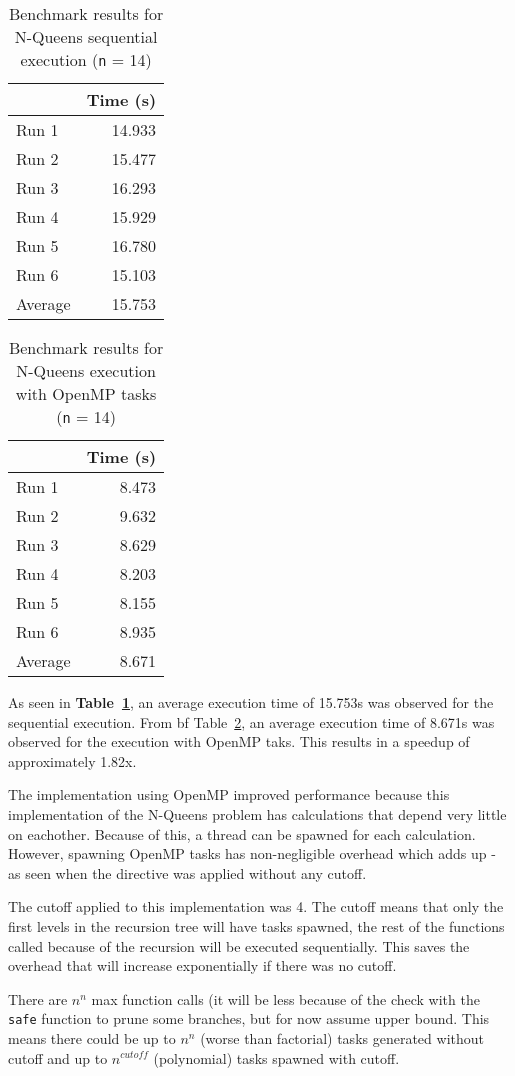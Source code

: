 \documentclass[12pt]{article}
\begin{document}
\begin{table}[H]
  \centering
  \begin{tabular}{lr}
    & {\bf Time (s)} \\
    \hline
    Run 1 & 14.933 \\
    Run 2 & 15.477 \\
    Run 3 & 16.293 \\
    Run 4 & 15.929 \\
    Run 5 & 16.780 \\
    Run 6 & 15.103 \\
    \hline
    Average & 15.753 \\
  \end{tabular}
  \caption{Benchmark results for N-Queens sequential execution ({\tt n} = 14)}
  \label{tbl-nqueens-sequential}
\end{table}

\begin{table}[H]
  \centering
  \begin{tabular}{lr}
    & {\bf Time (s)} \\
    \hline
    Run 1 & 8.473 \\
    Run 2 & 9.632 \\
    Run 3 & 8.629 \\
    Run 4 & 8.203 \\
    Run 5 & 8.155 \\
    Run 6 & 8.935 \\
    \hline
    Average & 8.671 \\
  \end{tabular}
  \caption{Benchmark results for N-Queens execution with OpenMP tasks ({\tt n} = 14)}
  \label{tbl-nqueens-tasks}
\end{table}

As seen in {\bf Table~\ref{tbl-nqueens-sequential}}, an average execution time of 15.753s was observed for the sequential execution. From {bf Table~\ref{tbl-nqueens-tasks}}, an average execution time of 8.671s was observed for the execution with OpenMP taks. This results in a speedup of approximately 1.82x.

The implementation using OpenMP improved performance because this implementation of the N-Queens problem has calculations that depend very little on eachother. Because of this, a thread can be spawned for each calculation. However, spawning OpenMP tasks has non-negligible overhead which adds up - as seen when the directive was applied without any cutoff.

The cutoff applied to this implementation was 4. The cutoff means that only the first levels in the recursion tree will have tasks spawned, the rest of the functions called because of the recursion will be executed sequentially. This saves the overhead that will increase exponentially if there was no cutoff.

There are \( n^n \) max function calls (it will be less because of the check with the {\tt safe} function to prune some branches, but for now assume upper bound. This means there could be up to \( n^n \) (worse than factorial) tasks generated without cutoff and up to \( n^{cutoff} \) (polynomial) tasks spawned with cutoff.
\end{document}
